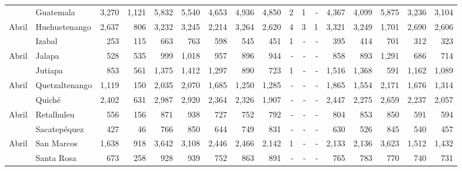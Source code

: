 \begin{landscape}
\begin{center}
\begin{longtable}{llrrrrrrrrrrrrrrr}
			\rowcolor{color1!5!white}\multicolumn{1}{l}{	\footnotesize	 Abril 	}&	 Guatemala 	&	 3,270 	&	 1,121 	&	 5,832 	&	 5,540 	&	 4,653 	&	 4,936 	&	 4,850 	&	 2 	&	 1 	&	 -   	&	 4,367 	&	 4,099 	&	 5,875 	&	 3,236 	&	 3,104 	\\
			\multicolumn{1}{l}{	\footnotesize	 Abril 	}&	 Huehuetenango 	&	 2,637 	&	 806 	&	 3,232 	&	 3,245 	&	 2,214 	&	 3,264 	&	 2,620 	&	 4 	&	 3 	&	 1 	&	 3,321 	&	 3,249 	&	 1,701 	&	 2,690 	&	 2,606 	\\
			\rowcolor{color1!5!white}\multicolumn{1}{l}{	\footnotesize	 Abril 	}&	 Izabal 	&	 253 	&	 115 	&	 663 	&	 763 	&	 598 	&	 545 	&	 451 	&	 1 	&	 -   	&	 -   	&	 395 	&	 414 	&	 701 	&	 312 	&	 323 	\\
			\multicolumn{1}{l}{	\footnotesize	 Abril 	}&	 Jalapa 	&	 528 	&	 535 	&	 999 	&	 1,018 	&	 957 	&	 896 	&	 944 	&	 -   	&	 -   	&	 -   	&	 858 	&	 893 	&	 1,291 	&	 686 	&	 714 	\\
			\rowcolor{color1!5!white}\multicolumn{1}{l}{	\footnotesize	 Abril 	}&	 Jutiapa 	&	 853 	&	 561 	&	 1,375 	&	 1,412 	&	 1,297 	&	 890 	&	 723 	&	 1 	&	 -   	&	 -   	&	 1,516 	&	 1,368 	&	 591 	&	 1,162 	&	 1,089 	\\
			\multicolumn{1}{l}{	\footnotesize	 Abril 	}&	 Quetzaltenango 	&	 1,119 	&	 150 	&	 2,035 	&	 2,070 	&	 1,685 	&	 1,250 	&	 1,285 	&	 -   	&	 -   	&	 -   	&	 1,865 	&	 1,554 	&	 2,171 	&	 1,676 	&	 1,314 	\\
			\rowcolor{color1!5!white}\multicolumn{1}{l}{	\footnotesize	 Abril 	}&	 Quiché 	&	 2,402 	&	 631 	&	 2,987 	&	 2,920 	&	 2,364 	&	 2,326 	&	 1,907 	&	 -   	&	 -   	&	 -   	&	 2,447 	&	 2,275 	&	 2,659 	&	 2,237 	&	 2,057 	\\
			\multicolumn{1}{l}{	\footnotesize	 Abril 	}&	 Retalhuleu 	&	 556 	&	 156 	&	 871 	&	 938 	&	 727 	&	 752 	&	 792 	&	 -   	&	 -   	&	 -   	&	 804 	&	 853 	&	 850 	&	 591 	&	 594 	\\
			\rowcolor{color1!5!white}\multicolumn{1}{l}{	\footnotesize	 Abril 	}&	 Sacatepéquez 	&	 427 	&	 46 	&	 766 	&	 850 	&	 644 	&	 749 	&	 831 	&	 -   	&	 -   	&	 -   	&	 630 	&	 526 	&	 845 	&	 540 	&	 457 	\\
			\multicolumn{1}{l}{	\footnotesize	 Abril 	}&	 San Marcos 	&	 1,638 	&	 918 	&	 3,642 	&	 3,108 	&	 2,446 	&	 2,466 	&	 2,142 	&	 1 	&	 -   	&	 -   	&	 2,133 	&	 2,136 	&	 3,623 	&	 1,512 	&	 1,432 	\\
			\rowcolor{color1!5!white}\multicolumn{1}{l}{	\footnotesize	 Abril 	}&	 Santa Rosa 	&	 673 	&	 258 	&	 928 	&	 939 	&	 752 	&	 863 	&	 891 	&	 -   	&	 -   	&	 -   	&	 765 	&	 783 	&	 770 	&	 740 	&	 731 	\\

\end{longtable}
\end{center}
\end{landscape}
